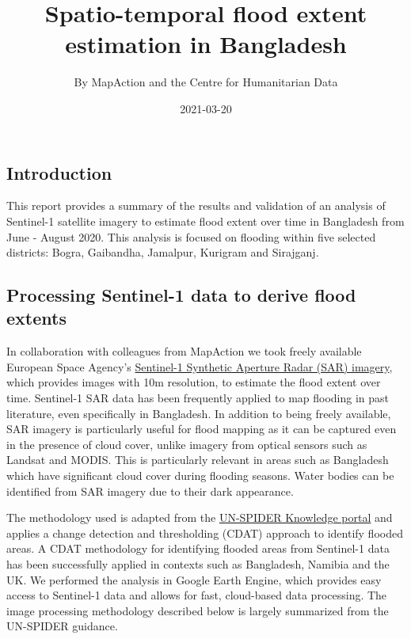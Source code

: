 \documentclass[
]{article}
\title{Spatio-temporal flood extent estimation in Bangladesh}
\author{By MapAction and the Centre for Humanitarian Data}
\date{2021-03-20}
\begin{document}
\maketitle

{
\setcounter{tocdepth}{4}
\tableofcontents
}
\hypertarget{introduction}{%
\subsection{Introduction}\label{introduction}}

This report provides a summary of the results and validation of an
analysis of Sentinel-1 satellite imagery to estimate flood extent over
time in Bangladesh from June - August 2020. This analysis is focused on
flooding within five selected districts: Bogra, Gaibandha, Jamalpur,
Kurigram and Sirajganj.

\hypertarget{processing-sentinel-1-data-to-derive-flood-extents}{%
\subsection{Processing Sentinel-1 data to derive flood
extents}\label{processing-sentinel-1-data-to-derive-flood-extents}}

In collaboration with colleagues from MapAction we took freely available
European Space Agency's
\href{https://sentinel.esa.int/web/sentinel/user-guides/sentinel-1-sar}{Sentinel-1
Synthetic Aperture Radar (SAR) imagery}, which provides images with 10m
resolution, to estimate the flood extent over time. Sentinel-1 SAR data
has been frequently applied to map flooding in past literature, even
specifically in Bangladesh. In addition to being freely available, SAR
imagery is particularly useful for flood mapping as it can be captured
even in the presence of cloud cover, unlike imagery from optical sensors
such as Landsat and MODIS. This is particularly relevant in areas such
as Bangladesh which have significant cloud cover during flooding
seasons. Water bodies can be identified from SAR imagery due to their
dark appearance.

The methodology used is adapted from the
\href{http://www.un-spider.org/advisory-support/recommended-practices/recommended-practice-google-earth-engine-flood-mapping/in-detail}{UN-SPIDER
Knowledge portal} and applies a change detection and thresholding (CDAT)
approach to identify flooded areas. A CDAT methodology for identifying
flooded areas from Sentinel-1 data has been successfully applied in
contexts such as Bangladesh, Namibia and the UK. We performed the
analysis in Google Earth Engine, which provides easy access to
Sentinel-1 data and allows for fast, cloud-based data processing. The
image processing methodology described below is largely summarized from
the UN-SPIDER guidance.
\end{document}
